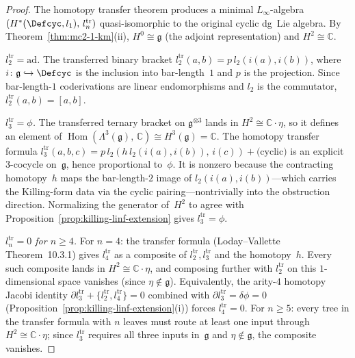 \begin{proof}
The homotopy transfer theorem produces a minimal $L_\infty$-algebra
$(H^*(\Defcyc, l_1),\, l_n^{\mathrm{tr}})$ quasi-isomorphic to the
original cyclic dg~Lie algebra.  By
Theorem~\ref{thm:mc2-1-km}(ii), $H^0 \cong \mathfrak{g}$ (the
adjoint representation) and $H^2 \cong \mathbb{C}$.

\emph{$l_2^{\mathrm{tr}} = \mathrm{ad}$.}
The transferred binary bracket $l_2^{\mathrm{tr}}(a,b) =
p\,l_2(i(a), i(b))$, where $i\colon \mathfrak{g} \hookrightarrow
\Defcyc$ is the inclusion into bar-length~$1$ and $p$ is the
projection.  Since bar-length-$1$ coderivations are linear
endomorphisms and $l_2$ is the commutator, $l_2^{\mathrm{tr}}(a,b)
= [a,b]$.

\emph{$l_3^{\mathrm{tr}} = \phi$.}
The transferred ternary bracket on $\mathfrak{g}^{\otimes 3}$
lands in $H^2 \cong \mathbb{C}\cdot\eta$, so it defines an element of
$\operatorname{Hom}(\Lambda^3(\mathfrak{g}),\, \mathbb{C})
\cong H^3(\mathfrak{g}) = \mathbb{C}$.
The homotopy transfer formula
$l_3^{\mathrm{tr}}(a,b,c) = p\,l_2(h\,l_2(i(a),i(b)),\, i(c))
+ \text{(cyclic)}$
is an explicit $3$-cocycle on~$\mathfrak{g}$, hence proportional
to~$\phi$.  It is nonzero because the contracting homotopy~$h$
maps the bar-length-$2$ image of $l_2(i(a),i(b))$---which carries
the Killing-form data via the cyclic pairing---nontrivially
into the obstruction direction.
Normalizing the generator of~$H^2$ to agree with
Proposition~\ref{prop:killing-linf-extension}
gives $l_3^{\mathrm{tr}} = \phi$.

\emph{$l_n^{\mathrm{tr}} = 0$ for $n \geq 4$.}
For $n = 4$: the transfer formula
(Loday--Vallette \cite{LV12} Theorem~10.3.1) gives
$l_4^{\mathrm{tr}}$ as a composite of $l_2^{\mathrm{tr}}, l_3^{\mathrm{tr}}$
and the homotopy~$h$.  Every such composite lands in
$H^2 \cong \mathbb{C}\cdot\eta$, and composing further with
$l_2^{\mathrm{tr}}$ on this $1$-dimensional space vanishes
(since $\eta \notin \mathfrak{g}$).  Equivalently, the arity-$4$
homotopy Jacobi identity $\partial l_3^{\mathrm{tr}} +
\{l_2^{\mathrm{tr}}, l_4^{\mathrm{tr}}\} = 0$ combined with
$\partial l_3^{\mathrm{tr}} = \delta\phi = 0$
(Proposition~\ref{prop:killing-linf-extension}(i)) forces
$l_4^{\mathrm{tr}} = 0$.
For $n \geq 5$: every tree in the transfer formula with $n$ leaves
must route at least one input through $H^2 \cong \mathbb{C}\cdot\eta$;
since $l_3^{\mathrm{tr}}$ requires all three inputs in~$\mathfrak{g}$
and $\eta \notin \mathfrak{g}$, the composite vanishes.
\end{proof}


